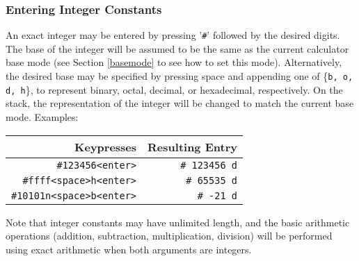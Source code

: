 \documentclass[11pt,notitlepage]{article}
\begin{document}
\subsubsection{Entering Integer Constants}
An exact integer may be entered by pressing '{\tt \#}' followed by the desired
digits.  The base of the integer will be assumed to be the same as the current
calculator base mode (see Section \ref{basemode} to see how to set this mode).
Alternatively, the desired base may be specified by pressing space and appending
one of \{{\tt b, o, d, h}\}, to represent binary, octal, decimal, or hexadecimal,
respectively.  On the stack, the representation of the integer will be changed
to match the current base mode.  Examples:
\begin{center}
   \begin{tabular}[t]{|r|r|}
      \hline Keypresses & Resulting Entry \\
      \hline
      {\tt \#123456<enter>} & {\tt \# 123456 d} \\
      {\tt \#ffff<space>h<enter>} & {\tt \# 65535 d} \\
      {\tt \#10101n<space>b<enter>} & {\tt \# -21 d} \\
      \hline
   \end{tabular}
\end{center}

Note that integer constants may have unlimited length, and the basic arithmetic
operations (addition, subtraction, multiplication, division) will be performed
using exact arithmetic when both arguments are integers.
\end{document}
